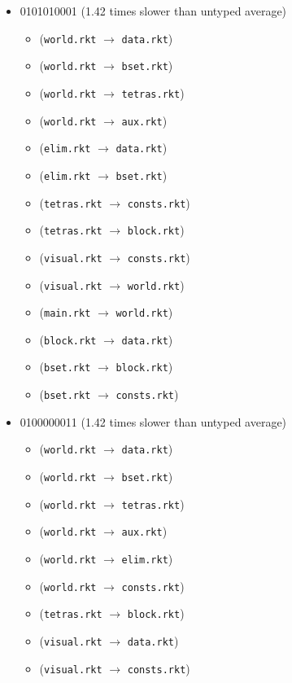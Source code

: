 \documentclass{article}
\newcommand{\mono}[1]{\texttt{#1}}
\begin{document}
\begin{itemize}
\begin{itemize}
  \end{itemize}
\item 0101010001 (1.42 times slower than untyped average)
  \begin{itemize}
  \item (\mono{world.rkt} $\rightarrow$ \mono{data.rkt})
  \item (\mono{world.rkt} $\rightarrow$ \mono{bset.rkt})
  \item (\mono{world.rkt} $\rightarrow$ \mono{tetras.rkt})
  \item (\mono{world.rkt} $\rightarrow$ \mono{aux.rkt})
  \item (\mono{elim.rkt} $\rightarrow$ \mono{data.rkt})
  \item (\mono{elim.rkt} $\rightarrow$ \mono{bset.rkt})
  \item (\mono{tetras.rkt} $\rightarrow$ \mono{consts.rkt})
  \item (\mono{tetras.rkt} $\rightarrow$ \mono{block.rkt})
  \item (\mono{visual.rkt} $\rightarrow$ \mono{consts.rkt})
  \item (\mono{visual.rkt} $\rightarrow$ \mono{world.rkt})
  \item (\mono{main.rkt} $\rightarrow$ \mono{world.rkt})
  \item (\mono{block.rkt} $\rightarrow$ \mono{data.rkt})
  \item (\mono{bset.rkt} $\rightarrow$ \mono{block.rkt})
  \item (\mono{bset.rkt} $\rightarrow$ \mono{consts.rkt})
  \end{itemize}
\item 0100000011 (1.42 times slower than untyped average)
  \begin{itemize}
  \item (\mono{world.rkt} $\rightarrow$ \mono{data.rkt})
  \item (\mono{world.rkt} $\rightarrow$ \mono{bset.rkt})
  \item (\mono{world.rkt} $\rightarrow$ \mono{tetras.rkt})
  \item (\mono{world.rkt} $\rightarrow$ \mono{aux.rkt})
  \item (\mono{world.rkt} $\rightarrow$ \mono{elim.rkt})
  \item (\mono{world.rkt} $\rightarrow$ \mono{consts.rkt})
  \item (\mono{tetras.rkt} $\rightarrow$ \mono{block.rkt})
  \item (\mono{visual.rkt} $\rightarrow$ \mono{data.rkt})
  \item (\mono{visual.rkt} $\rightarrow$ \mono{consts.rkt})

\end{itemize}
\end{itemize}
\end{document}

